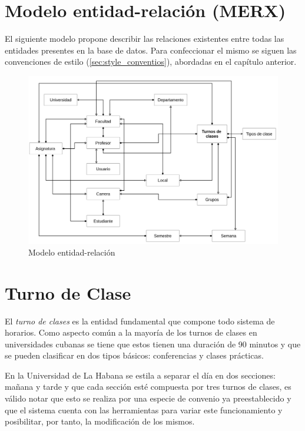 \section{Modelo entidad-relación (MERX)}

El siguiente modelo propone describir las relaciones existentes entre todas las entidades presentes en la base de datos. Para confeccionar el mismo se siguen las convenciones de estilo (\ref{sec:style_conventios}), abordadas en el capítulo anterior.


\begin{figure}[h!]
	\centering
	\includegraphics[width=1\linewidth]{images/Chapter 2/MERX}
	\caption{ Modelo entidad-relación }
	\label{fig:merx}
\end{figure}


\section{Turno de Clase}
\label{sec:classes}

El \textit{turno de clases} es la entidad fundamental que compone todo sistema de horarios. Como aspecto común a la mayoría de los turnos de clases en universidades cubanas se tiene que estos tienen una duración de 90 minutos y que se pueden clasificar en dos tipos básicos: conferencias y clases prácticas.

En la Universidad de La Habana se estila a separar el día en dos secciones: mañana y tarde y que cada sección esté compuesta por tres turnos de clases, es válido notar que esto se realiza por una especie de convenio ya preestablecido y que el sistema cuenta con las herramientas para variar este funcionamiento y posibilitar, por tanto, la modificación de los mismos. 

